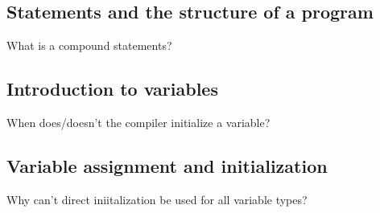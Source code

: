 \documentclass[a4paper,10pt]{article}
\begin{document}
\subsection{Statements and the structure of a program}

What is a compound statements?

\subsection{Introduction to variables}

When does/doesn't the compiler initialize a variable?

\subsection{Variable assignment and initialization}

Why can't direct iniitalization be used for all variable types?
\end{document}
